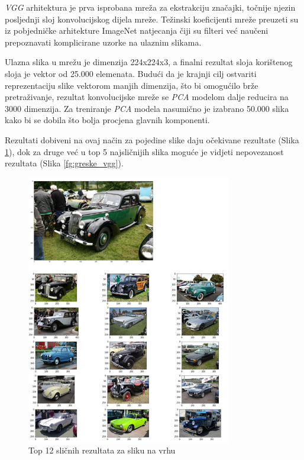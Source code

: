 \documentclass[times, utf8, proizvoljni, numeric]{fer}
\begin{document}
\textit{VGG} arhitektura je prva isprobana mreža za ekstrakciju značajki, točnije njezin posljednji sloj konvolucijskog dijela mreže. Težinski koeficijenti mreže preuzeti su iz pobjedničke arhitekture ImageNet natjecanja čiji su filteri već naučeni prepoznavati komplicirane uzorke na ulaznim slikama.

Ulazna slika u mrežu je dimenzija 224x224x3, a finalni rezultat sloja korištenog sloja je vektor od 25.000 elemenata. Budući da je krajnji cilj ostvariti reprezentaciju slike vektorom manjih dimenzija, što bi omogućilo brže pretraživanje, rezultat konvolucijske mreže se \textit{PCA} modelom dalje reducira na 3000 dimenzija. Za treniranje \textit{PCA} modela nasumično je izabrano 50.000 slika kako bi se dobila što bolja procjena glavnih komponenti.

Rezultati dobiveni na ovaj način za pojedine slike daju očekivane rezultate (Slika \ref{fg:auti_vgg}), dok za druge već u top 5 najsličnijih slika moguće je vidjeti nepovezanost rezultata (Slika \ref{fg:greske_vgg}). 

\begin{figure}[!ht]
	\begin{center}
		\captionsetup{justification=centering}
		\includegraphics[width=0.8\textwidth]{./imgs/auti_vgg.png}
		\caption{Top 12 sličnih rezultata za sliku na vrhu}
		\label{fg:auti_vgg}
	\end{center}
\end{figure}
\end{document}
